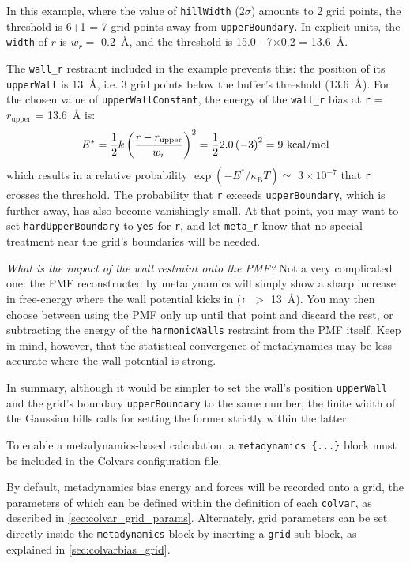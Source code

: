 In this example, where the value of \texttt{hillWidth} ($2\sigma$) amounts to 2 grid points, the threshold is 6+1 = 7 grid points away from \texttt{upperBoundary}.
In explicit units, the \texttt{width} of $r$ is $w_r =$ 0.2~\AA, and the threshold is 15.0 - 7$\times$0.2 = 13.6~\AA.

The \texttt{wall\_r} restraint included in the example prevents this: the position of its \texttt{upperWall} is 13~\AA{}, i.e.{} 3 grid points below the buffer's threshold (13.6~\AA).
For the chosen value of \texttt{upperWallConstant}, the energy of the \texttt{wall\_r} bias at \texttt{r} = $r_{\mathrm{upper}}$ = 13.6~\AA{} is:
\begin{equation*}
  E^* = \frac{1}{2} \- k \left(\frac{r - r_{\mathrm{upper}}}{w_r}\right)^2 = \frac{1}{2} \- 2.0 \left(-3\right)^2 = 9~\mathrm{kcal/mol}
\end{equation*}
which results in a relative probability $\exp(-E^*/\kappa_{\mathrm{B}}T) \simeq$ $3\times{}10^{-7}$ that \texttt{r} crosses the threshold.
The probability that \texttt{r} exceeds \texttt{upperBoundary}, which is further away, has also become vanishingly small.
At that point, you may want to set \texttt{hardUpperBoundary} to \texttt{yes} for \texttt{r}, and let \texttt{meta\_r} know that no special treatment near the grid's boundaries will be needed.

\emph{What is the impact of the wall restraint onto the PMF?} Not a very complicated one: the PMF reconstructed by metadynamics will simply show a sharp increase in free-energy where the wall potential kicks in (\texttt{r}~$>$ 13~\AA{}).
You may then choose between using the PMF only up until that point and discard the rest, or subtracting the energy of the \texttt{harmonicWalls} restraint from the PMF itself.
Keep in mind, however, that the statistical convergence of metadynamics may be less accurate where the wall potential is strong.

In summary, although it would be simpler to set the wall's position \texttt{upperWall} and the grid's boundary \texttt{upperBoundary} to the same number, the finite width of the Gaussian hills calls for setting the former strictly within the latter.



To enable a metadynamics-based calculation, a \texttt{metadynamics \{...\}} block must be included in the Colvars configuration file.

By default, metadynamics bias energy and forces will be recorded onto a grid, the parameters of which can be defined within the definition of each \texttt{colvar}, as described in \ref{sec:colvar_grid_params}.
Alternately, grid parameters can be set directly inside the \texttt{metadynamics} block by inserting a \texttt{grid} sub-block, as explained in \ref{sec:colvarbias_grid}.


